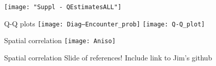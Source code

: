 \documentclass[xcolor=x11names,compress]{beamer}
\renewcommand{\(}{\begin{columns}}
\renewcommand{\)}{\end{columns}}
\newcommand{\<}[1]{\begin{column}{#1}}
\renewcommand{\>}{\end{column}}
\begin{document}
\begin{frame}
\centering
\texttt{[image: "Suppl - QEstimatesALL"]}

\end{frame}

\begin{frame}{Q-Q plots}
\centering
\texttt{[image: Diag--Encounter\_prob]}
\texttt{[image: Q-Q\_plot]}

\end{frame}

\begin{frame}{Spatial correlation}
	\centering
\texttt{[image: Aniso]}
\end{frame}

\begin{frame}{Spatial correlation}
Slide of references!
Include link to Jim's github
\end{frame}


\end{document}

